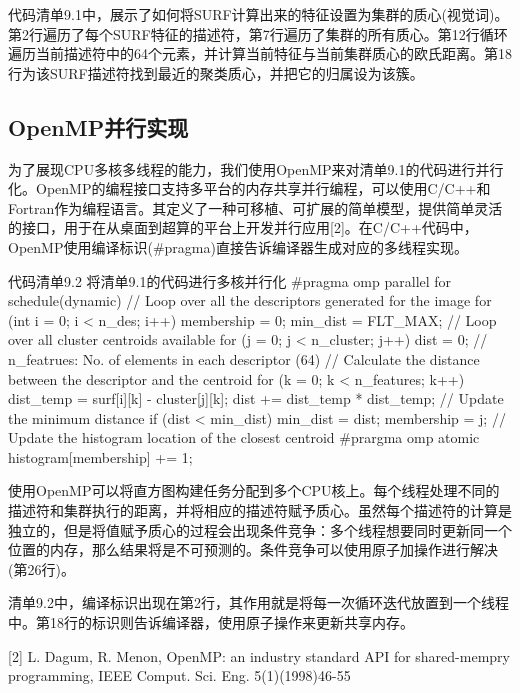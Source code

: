 代码清单9.1中，展示了如何将SURF计算出来的特征设置为集群的质心(视觉词)。第2行遍历了每个SURF特征的描述符，第7行遍历了集群的所有质心。第12行循环遍历当前描述符中的64个元素，并计算当前特征与当前集群质心的欧氏距离。第18行为该SURF描述符找到最近的聚类质心，并把它的归属设为该簇。

\subsection{OpenMP并行实现}

为了展现CPU多核多线程的能力，我们使用OpenMP来对清单9.1的代码进行并行化。OpenMP的编程接口支持多平台的内存共享并行编程，可以使用C/C++和Fortran作为编程语言。其定义了一种可移植、可扩展的简单模型，提供简单灵活的接口，用于在从桌面到超算的平台上开发并行应用[2]。在C/C++代码中，OpenMP使用编译标识(\#pragma)直接告诉编译器生成对应的多线程实现。

\begin{codeboxt}[cpp]{代码清单9.2 将清单9.1的代码进行多核并行化}
#pragma omp parallel for schedule(dynamic)
// Loop over all the descriptors generated for the image
for (int i = 0; i < n_des; i++){
  membership = 0;
  min_dist = FLT_MAX;
  // Loop over all cluster centroids available
  for (j = 0; j < n_cluster; j++){
    dist = 0;
    // n_featrues: No. of elements in each descriptor (64)
    // Calculate the distance between the descriptor and the centroid
    for (k = 0; k < n_features; k++){
      dist_temp = surf[i][k] - cluster[j][k];
      dist += dist_temp * dist_temp;
    }
    // Update the minimum distance
    if (dist < min_dist){
      min_dist = dist;
      membership = j;
    }
  }
  // Update the histogram location of the closest centroid
  #prargma omp atomic
  histogram[membership] += 1;
}
\end{codeboxt}

使用OpenMP可以将直方图构建任务分配到多个CPU核上。每个线程处理不同的描述符和集群执行的距离，并将相应的描述符赋予质心。虽然每个描述符的计算是独立的，但是将值赋予质心的过程会出现条件竞争：多个线程想要同时更新同一个位置的内存，那么结果将是不可预测的。条件竞争可以使用原子加操作进行解决(第26行)。

清单9.2中，编译标识出现在第2行，其作用就是将每一次循环迭代放置到一个线程中。第18行的标识则告诉编译器，使用原子操作来更新共享内存。

\myRefRule

\begin{myRefs}

[2] L. Dagum, R. Menon, OpenMP: an industry standard API for shared-mempry programming, IEEE Comput. Sci. Eng. 5(1)(1998)46-55

\end{myRefs}



